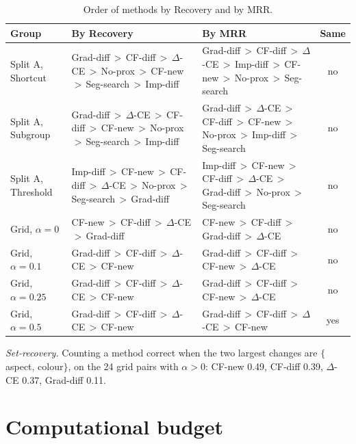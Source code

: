 \documentclass[10pt,a4paper]{article}
\theoremstyle{remark}
\begin{document}
\begin{table}[h]
\caption{Order of methods by Recovery and by MRR.}\label{tab:order}
\centering\scriptsize
\setlength{\tabcolsep}{3pt}
\begin{tabular}{@{}l>{\raggedright\arraybackslash}p{5.6cm}>{\raggedright\arraybackslash}p{5.6cm}c@{}}
\toprule
Group & By Recovery & By MRR & Same\\
\midrule
Split A, Shortcut & Grad-diff\,$>$\,CF-diff\,$>$\,$\Delta$-CE\,$>$\,No-prox\,$>$\,CF-new\,$>$\,Seg-search\,$>$\,Imp-diff & Grad-diff\,$>$\,CF-diff\,$>$\,$\Delta$-CE\,$>$\,Imp-diff\,$>$\,CF-new\,$>$\,No-prox\,$>$\,Seg-search & no \\
Split A, Subgroup & Grad-diff\,$>$\,$\Delta$-CE\,$>$\,CF-diff\,$>$\,CF-new\,$>$\,No-prox\,$>$\,Seg-search\,$>$\,Imp-diff & Grad-diff\,$>$\,$\Delta$-CE\,$>$\,CF-diff\,$>$\,CF-new\,$>$\,No-prox\,$>$\,Imp-diff\,$>$\,Seg-search & no \\
Split A, Threshold & Imp-diff\,$>$\,CF-new\,$>$\,CF-diff\,$>$\,$\Delta$-CE\,$>$\,No-prox\,$>$\,Seg-search\,$>$\,Grad-diff & Imp-diff\,$>$\,CF-new\,$>$\,CF-diff\,$>$\,$\Delta$-CE\,$>$\,Grad-diff\,$>$\,No-prox\,$>$\,Seg-search & no \\
Grid, $\alpha=0$ & CF-new\,$>$\,CF-diff\,$>$\,$\Delta$-CE\,$>$\,Grad-diff & CF-new\,$>$\,CF-diff\,$>$\,Grad-diff\,$>$\,$\Delta$-CE & no \\
Grid, $\alpha=0.1$ & Grad-diff\,$>$\,CF-diff\,$>$\,$\Delta$-CE\,$>$\,CF-new & Grad-diff\,$>$\,CF-diff\,$>$\,CF-new\,$>$\,$\Delta$-CE & no \\
Grid, $\alpha=0.25$ & Grad-diff\,$>$\,CF-diff\,$>$\,$\Delta$-CE\,$>$\,CF-new & Grad-diff\,$>$\,CF-diff\,$>$\,CF-new\,$>$\,$\Delta$-CE & no \\
Grid, $\alpha=0.5$ & Grad-diff\,$>$\,CF-diff\,$>$\,$\Delta$-CE\,$>$\,CF-new & Grad-diff\,$>$\,CF-diff\,$>$\,$\Delta$-CE\,$>$\,CF-new & yes \\
\bottomrule
\end{tabular}
\end{table}

\emph{Set-recovery.} Counting a method correct when the two largest changes are $\{$aspect, colour$\}$, on the 24 grid pairs with $\alpha>0$: CF-new 0.49, CF-diff 0.39, $\Delta$-CE 0.37, Grad-diff 0.11.

\section{Computational budget}\label{sec:budget}
\end{document}
